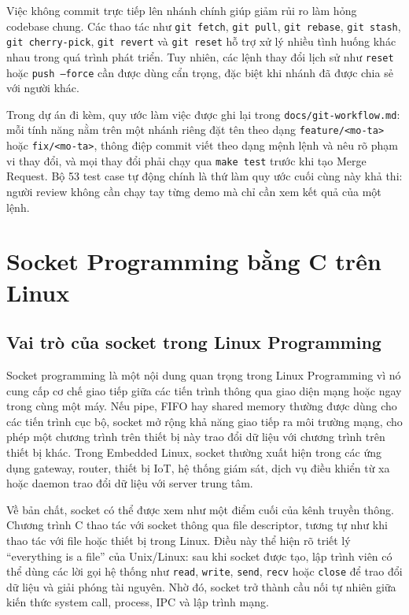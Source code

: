 \documentclass[11pt]{article}
\newcommand{\code}[1]{\texttt{#1}}
\begin{document}
Việc không commit trực tiếp lên nhánh chính giúp giảm rủi ro làm hỏng codebase chung. Các thao tác như \code{git fetch}, \code{git pull}, \code{git rebase}, \code{git stash}, \code{git cherry-pick}, \code{git revert} và \code{git reset} hỗ trợ xử lý nhiều tình huống khác nhau trong quá trình phát triển. Tuy nhiên, các lệnh thay đổi lịch sử như \code{reset} hoặc \code{push --force} cần được dùng cẩn trọng, đặc biệt khi nhánh đã được chia sẻ với người khác.

Trong dự án đi kèm, quy ước làm việc được ghi lại trong \code{docs/git-workflow.md}: mỗi tính năng nằm trên một nhánh riêng đặt tên theo dạng \code{feature/<mo-ta>} hoặc \code{fix/<mo-ta>}, thông điệp commit viết theo dạng mệnh lệnh và nêu rõ phạm vi thay đổi, và mọi thay đổi phải chạy qua \code{make test} trước khi tạo Merge Request. Bộ 53 test case tự động chính là thứ làm quy ước cuối cùng này khả thi: người review không cần chạy tay từng demo mà chỉ cần xem kết quả của một lệnh.

\section{Socket Programming bằng C trên Linux}

\subsection{Vai trò của socket trong Linux Programming}

Socket programming là một nội dung quan trọng trong Linux Programming vì nó cung cấp cơ chế giao tiếp giữa các tiến trình thông qua giao diện mạng hoặc ngay trong cùng một máy. Nếu pipe, FIFO hay shared memory thường được dùng cho các tiến trình cục bộ, socket mở rộng khả năng giao tiếp ra môi trường mạng, cho phép một chương trình trên thiết bị này trao đổi dữ liệu với chương trình trên thiết bị khác. Trong Embedded Linux, socket thường xuất hiện trong các ứng dụng gateway, router, thiết bị IoT, hệ thống giám sát, dịch vụ điều khiển từ xa hoặc daemon trao đổi dữ liệu với server trung tâm.

Về bản chất, socket có thể được xem như một điểm cuối của kênh truyền thông. Chương trình C thao tác với socket thông qua file descriptor, tương tự như khi thao tác với file hoặc thiết bị trong Linux. Điều này thể hiện rõ triết lý ``everything is a file'' của Unix/Linux: sau khi socket được tạo, lập trình viên có thể dùng các lời gọi hệ thống như \code{read}, \code{write}, \code{send}, \code{recv} hoặc \code{close} để trao đổi dữ liệu và giải phóng tài nguyên. Nhờ đó, socket trở thành cầu nối tự nhiên giữa kiến thức system call, process, IPC và lập trình mạng.
\end{document}
